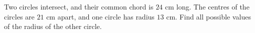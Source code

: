 Two circles intersect, and their common chord is $24$ cm long. The centres of the circles are $21$ cm apart, and one circle has radius $13$ cm. Find all possible values of the radius of the other circle.
